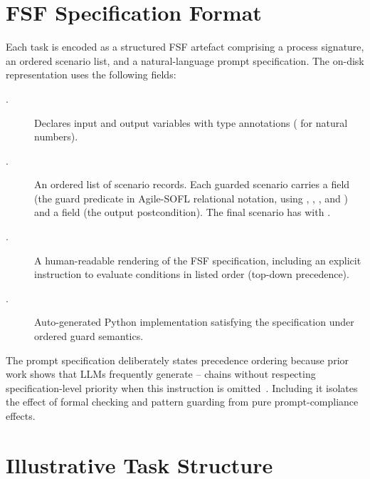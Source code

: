 \section{FSF Specification Format}
\label{sec:bench:format}

Each task is encoded as a structured FSF artefact comprising a process
signature, an ordered scenario list, and a natural-language prompt
specification.  The on-disk representation uses the following fields:

\begin{description}
  \item[.]
        Declares input and output variables with type annotations
        ( for natural numbers).
  \item[.]
        An ordered list of scenario records.  Each guarded scenario carries
        a  field (the guard predicate in Agile-SOFL relational
        notation, using , , , and \code{\&\&}) and
        a  field (the output postcondition).  The final scenario
        has  with .
  \item[.]
        A human-readable rendering of the FSF specification, including an
        explicit instruction to evaluate conditions in listed order
        (top-down precedence).
  \item[.]
        Auto-generated Python implementation satisfying the specification
        under ordered guard semantics.
\end{description}

The prompt specification deliberately states precedence ordering because
prior work shows that LLMs frequently generate -- chains
without respecting specification-level priority when this instruction is
omitted~\citep{lynn2024verifierloop,loughman2024dafnybench}.  Including it isolates the effect of formal checking and pattern
guarding from pure prompt-compliance effects.

\section{Illustrative Task Structure}
\label{sec:bench:example}

